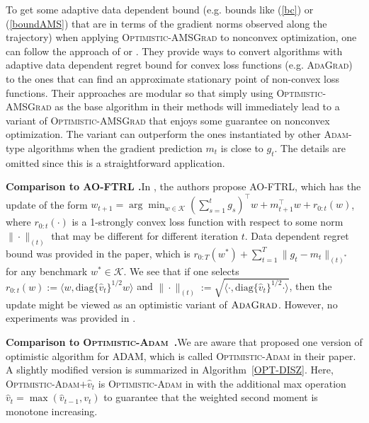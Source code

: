 \documentclass[11pt]{article}
\def\K{\mathcal{K}}
\theoremstyle{k}
\begin{document}
To get some adaptive data dependent bound (e.g. bounds like (\ref{bc}) or (\ref{boundAMS})
that are in terms of the gradient norms observed along the trajectory) when applying 
\textsc{Optimistic-AMSGrad} to nonconvex optimization,
one can follow the approach of \cite{Princeton18} or \cite{CYYZC19}.
They provide ways to convert algorithms with adaptive data dependent regret bound
for convex loss functions (e.g. \textsc{AdaGrad}) to the ones that can find an approximate stationary point of non-convex loss functions. 
Their approaches are modular so that simply using \textsc{Optimistic-AMSGrad}
as the base algorithm in their methods will immediately lead to a variant of \textsc{Optimistic-AMSGrad} that enjoys some guarantee on nonconvex optimization.
The variant can outperform the ones instantiated by other \textsc{Adam}-type algorithms when
the gradient prediction $m_t$ is close to $g_t$.
The details are omitted since this is a straightforward application.

\textbf{Comparison to AO-FTRL \cite{MY16}.}\hspace{0.1in}In \cite{MY16}, the authors propose AO-FTRL, which has the update of 
the form $w_{t+1} = \arg\min_{{w \in \K}} ( \sum_{s=1}^t g_s )^{\top}  w + m_{t+1}^\top w + r_{0:t}(w) $, where $r_{0:t}(\cdot)$ is a 1-strongly convex loss function with respect to some norm $\| \cdot\|_{(t)}$ that may be different for different iteration $t$. 
Data dependent regret bound was provided in the paper, which is $r_{{0:T}}(w^*) + \sum_{t=1}^T \| g_t - m_t \|_{(t)^*}$ for any benchmark $w^{*} \in \K$. We see that if
one selects $r_{0:t}(w) := \langle w, \text{diag}\{\hat{v}_t\}^{1/2} w \rangle$ 
and $\| \cdot \|_{(t)}:= 
\sqrt{ \langle \cdot, \text{diag}\{\hat{v}_t\}^{1/2} \cdot \rangle }$, then the update might be viewed as an optimistic variant of $\textsc{AdaGrad}$. However, no experiments was provided in \cite{MY16}. 


\textbf{Comparison to \textsc{Optimistic-Adam}~\cite{DISZ18}.}\hspace{0.1in}We are aware that \cite{DISZ18} proposed one version of optimistic algorithm for ADAM, which
is called \textsc{Optimistic-Adam} in their paper. A slightly modified version is summarized in Algorithm~\ref{OPT-DISZ}. Here, \textsc{Optimistic-Adam$+\hat{v}_t$} is \textsc{Optimistic-Adam} in \cite{DISZ18} with the additional max operation $\hat{v}_t = \max ( \hat{v}_{t-1}, v_t)$ to guarantee that the weighted second moment is monotone increasing.
\end{document}

